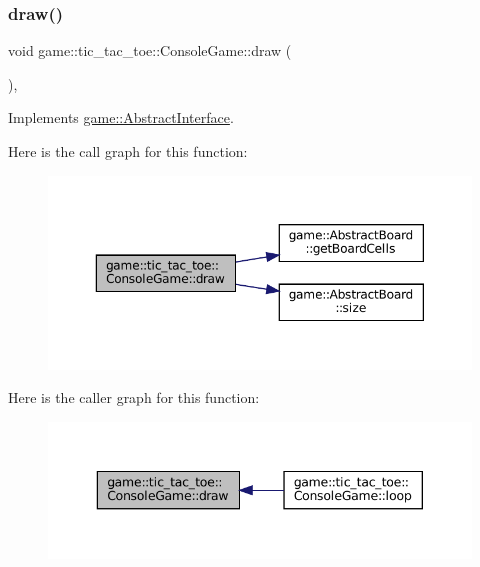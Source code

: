 \subsubsection{\texorpdfstring{draw()}{draw()}}
{\footnotesize\ttfamily void game\+::tic\+\_\+tac\+\_\+toe\+::\+Console\+Game\+::draw (\begin{DoxyParamCaption}{ }\end{DoxyParamCaption})\hspace{0.3cm}{\ttfamily [override]}, {\ttfamily [virtual]}}



Implements \hyperlink{classgame_1_1_abstract_interface_af4330557019768a4be424165e4cf008f}{game\+::\+Abstract\+Interface}.

Here is the call graph for this function\+:
\nopagebreak
\begin{figure}[H]
\begin{center}
\leavevmode
\includegraphics[width=350pt]{classgame_1_1tic__tac__toe_1_1_console_game_a209ec289b23e0325417d50a31a323b37_cgraph}
\end{center}
\end{figure}
Here is the caller graph for this function\+:
\nopagebreak
\begin{figure}[H]
\begin{center}
\leavevmode
\includegraphics[width=343pt]{classgame_1_1tic__tac__toe_1_1_console_game_a209ec289b23e0325417d50a31a323b37_icgraph}
\end{center}
\end{figure}
\mbox{\label{classgame_1_1tic__tac__toe_1_1_console_game_a06b07e4c713a60999258b0b573b02a33}} 
